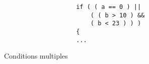 			\begin{figure}[H]
				\begin{changemargin}{-2.5cm}{-2.5cm}
				\begin{tcolorbox}
				\begin{verbatim}
					if ( ( a == 0 ) ||
					    ( ( b > 10 ) &&
					    ( b < 23 ) ) )
					{
					...
				\end{verbatim}
				\end{tcolorbox}
				\end{changemargin}
				\caption{Conditions multiples}
			\end{figure}

	
